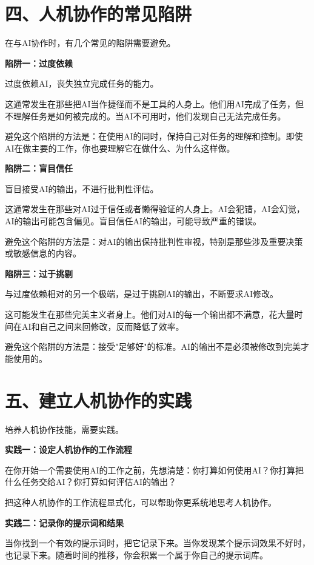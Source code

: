 \section{四、人机协作的常见陷阱}


在与AI协作时，有几个常见的陷阱需要避免。

\textbf{陷阱一：过度依赖}

过度依赖AI，丧失独立完成任务的能力。

这通常发生在那些把AI当作捷径而不是工具的人身上。他们用AI完成了任务，但不理解任务是如何被完成的。当AI不可用时，他们发现自己无法完成任务。

避免这个陷阱的方法是：在使用AI的同时，保持自己对任务的理解和控制。即使AI在做主要的工作，你也要理解它在做什么、为什么这样做。

\textbf{陷阱二：盲目信任}

盲目接受AI的输出，不进行批判性评估。

这通常发生在那些对AI过于信任或者懒得验证的人身上。AI会犯错，AI会幻觉，AI的输出可能包含偏见。盲目信任AI的输出，可能导致严重的错误。

避免这个陷阱的方法是：对AI的输出保持批判性审视，特别是那些涉及重要决策或敏感信息的内容。

\textbf{陷阱三：过于挑剔}

与过度依赖相对的另一个极端，是过于挑剔AI的输出，不断要求AI修改。

这可能发生在那些完美主义者身上。他们对AI的每一个输出都不满意，花大量时间在AI和自己之间来回修改，反而降低了效率。

避免这个陷阱的方法是：接受"足够好"的标准。AI的输出不是必须被修改到完美才能使用的。

\section{五、建立人机协作的实践}


培养人机协作技能，需要实践。

\textbf{实践一：设定人机协作的工作流程}

在你开始一个需要使用AI的工作之前，先想清楚：你打算如何使用AI？你打算把什么任务交给AI？你打算如何评估AI的输出？

把这种人机协作的工作流程显式化，可以帮助你更系统地思考人机协作。

\textbf{实践二：记录你的提示词和结果}

当你找到一个有效的提示词时，把它记录下来。当你发现某个提示词效果不好时，也记录下来。随着时间的推移，你会积累一个属于你自己的提示词库。

